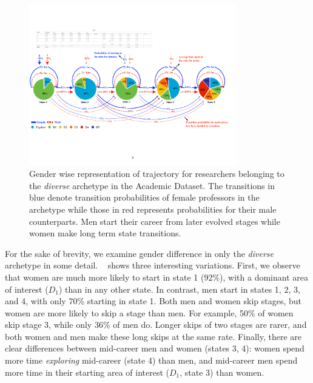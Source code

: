 \begin{figure}[tbh]
        \centering
        \includegraphics[width=1\linewidth,height=7cm]{figures/Cluster3_both_Self.pdf}
    \caption{
    \label{fig:genderacadclusters} Gender wise representation of trajectory for researchers belonging to the \emph{diverse} archetype in the Academic Dataset. The transitions in blue denote transition probabilities of female professors in the archetype while those in red represents probabilities for their male counterparts. Men start their career from later evolved stages while women make long term state transitions.}
    \label{fig:academic_gender}
\end{figure}

For the sake of brevity, we examine gender difference in only the \emph{diverse} archetype in some detail. ~ shows three interesting variations. First, we observe that women are much more likely to start in state 1 (92\%), with a dominant area of interest ($D_1$) than in any other state. In contrast, men start in states 1, 2, 3, and 4, with only 70\% starting in state 1. Both men and women skip stages, but women are more likely to skip a stage than men. For example, 50\% of women skip stage 3, while only 36\% of men do. Longer skips of two stages are rarer, and both women and men make these long skips at the same rate. Finally, there are clear differences between mid-career men and women (states 3, 4): women spend more time \emph{exploring} mid-career (state 4) than men, and mid-career men spend more time in their starting area of interest ($D_1$, state 3) than women.

